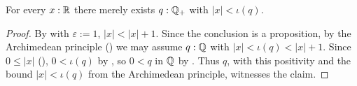 \begin{lemma}
  \label{existsAbsLtRatReal}
  For every $x : \mathbb{R}$ there merely exists $q : \mathbb{Q}_{+}$ with $\lvert x \rvert < \iota(q)$.
\end{lemma}
\begin{proof}
  By  with $\varepsilon := 1$, $\lvert x \rvert < \lvert x \rvert + 1$. Since the conclusion is a proposition, by the Archimedean principle () we may assume $q : \mathbb{Q}$ with $\lvert x \rvert < \iota(q) < \lvert x \rvert + 1$. Since $0 \le \lvert x \rvert$ (), $0 < \iota(q)$ by , so $0 < q$ in $\mathbb{Q}$ by . Thus $q$, with this positivity and the bound $\lvert x \rvert < \iota(q)$ from the Archimedean principle, witnesses the claim.
\end{proof}
